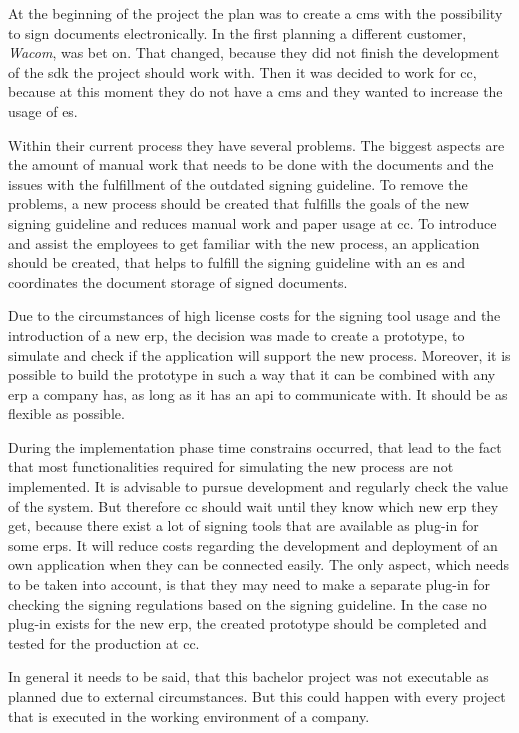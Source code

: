 At the beginning of the project the plan was to create a \gls{cms} with the possibility to sign documents electronically. 
In the first planning a different customer, \textit{Wacom}, was bet on. That changed, because they did not finish the development of the \gls{sdk} the project should work with. Then it was decided to work for \gls{cc}, because at this moment they do not have a \gls{cms} and they wanted to increase the usage of \gls{es}.

Within their current process they have several problems. The biggest aspects are the amount of manual work that needs to be done with the documents and the issues with the fulfillment of the outdated signing guideline. \newline
To remove the problems, a new process should be created that fulfills the goals of the new signing guideline and reduces manual work and paper usage at \gls{cc}. To introduce and assist the employees to get familiar with the new process, an application should be created, that helps to fulfill the signing guideline with an \gls{es} and coordinates the document storage of signed documents.

Due to the circumstances of high license costs for the signing tool usage and the introduction of a new \gls{erp}, the decision was made to create a prototype, to simulate and check if the application will support the new process. Moreover, it is possible to build the prototype in such a way that it can be combined with any \gls{erp} a company has, as long as it has an \gls{api} to communicate with. It should be as flexible as possible.

During the implementation phase time constrains occurred, that lead to the fact that most functionalities required for simulating the new process are not implemented. It is advisable to pursue development and regularly check the value of the system. But therefore \gls{cc} should wait until they know which new \gls{erp} they get, because there exist a lot of signing tools that are available as plug-in for some \glspl{erp}. It will reduce costs regarding the development and deployment of an own application when they can be connected easily. The only aspect, which needs to be taken into account, is that they may need to make a separate plug-in for checking the signing regulations based on the signing guideline. \newline
In the case no plug-in exists for the new \gls{erp}, the created prototype should be completed and tested for the production at \gls{cc}.

In general it needs to be said, that this bachelor project was not executable as planned due to external circumstances. 
But this could happen with every project that is executed in the working environment of a company.